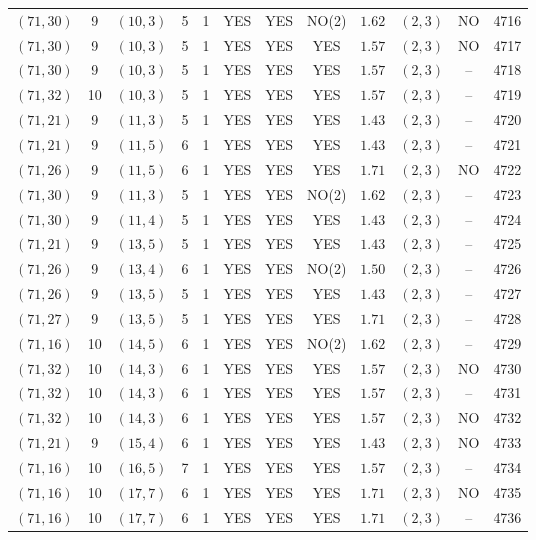 \begin{longtable}{|c|c|c|c|c|c|c|c|c|c|c|c|}
$(71,30)$ & 9 & $(10,3)$ & 5 & 1 & YES & YES & NO(2) & $1.62$ & $(2,3)$ & NO & 4716\\
$(71,30)$ & 9 & $(10,3)$ & 5 & 1 & YES & YES & YES & $1.57$ & $(2,3)$ & NO & 4717\\
$(71,30)$ & 9 & $(10,3)$ & 5 & 1 & YES & YES & YES & $1.57$ & $(2,3)$ & -- & 4718\\
$(71,32)$ & 10 & $(10,3)$ & 5 & 1 & YES & YES & YES & $1.57$ & $(2,3)$ & -- & 4719\\
$(71,21)$ & 9 & $(11,3)$ & 5 & 1 & YES & YES & YES & $1.43$ & $(2,3)$ & -- & 4720\\
$(71,21)$ & 9 & $(11,5)$ & 6 & 1 & YES & YES & YES & $1.43$ & $(2,3)$ & -- & 4721\\
$(71,26)$ & 9 & $(11,5)$ & 6 & 1 & YES & YES & YES & $1.71$ & $(2,3)$ & NO & 4722\\
$(71,30)$ & 9 & $(11,3)$ & 5 & 1 & YES & YES & NO(2) & $1.62$ & $(2,3)$ & -- & 4723\\
$(71,30)$ & 9 & $(11,4)$ & 5 & 1 & YES & YES & YES & $1.43$ & $(2,3)$ & -- & 4724\\
$(71,21)$ & 9 & $(13,5)$ & 5 & 1 & YES & YES & YES & $1.43$ & $(2,3)$ & -- & 4725\\
$(71,26)$ & 9 & $(13,4)$ & 6 & 1 & YES & YES & NO(2) & $1.50$ & $(2,3)$ & -- & 4726\\
$(71,26)$ & 9 & $(13,5)$ & 5 & 1 & YES & YES & YES & $1.43$ & $(2,3)$ & -- & 4727\\
$(71,27)$ & 9 & $(13,5)$ & 5 & 1 & YES & YES & YES & $1.71$ & $(2,3)$ & -- & 4728\\
$(71,16)$ & 10 & $(14,5)$ & 6 & 1 & YES & YES & NO(2) & $1.62$ & $(2,3)$ & -- & 4729\\
$(71,32)$ & 10 & $(14,3)$ & 6 & 1 & YES & YES & YES & $1.57$ & $(2,3)$ & NO & 4730\\
$(71,32)$ & 10 & $(14,3)$ & 6 & 1 & YES & YES & YES & $1.57$ & $(2,3)$ & -- & 4731\\
$(71,32)$ & 10 & $(14,3)$ & 6 & 1 & YES & YES & YES & $1.57$ & $(2,3)$ & NO & 4732\\
$(71,21)$ & 9 & $(15,4)$ & 6 & 1 & YES & YES & YES & $1.43$ & $(2,3)$ & NO & 4733\\
$(71,16)$ & 10 & $(16,5)$ & 7 & 1 & YES & YES & YES & $1.57$ & $(2,3)$ & -- & 4734\\
$(71,16)$ & 10 & $(17,7)$ & 6 & 1 & YES & YES & YES & $1.71$ & $(2,3)$ & NO & 4735\\
$(71,16)$ & 10 & $(17,7)$ & 6 & 1 & YES & YES & YES & $1.71$ & $(2,3)$ & -- & 4736\\

\end{longtable}
